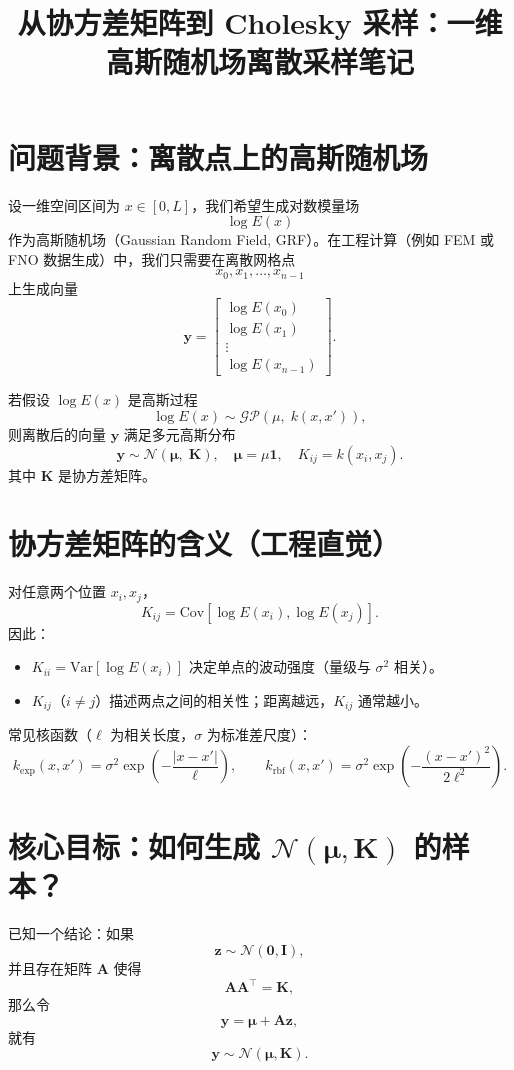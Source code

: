 \documentclass[11pt,a4paper]{article}
\title{从协方差矩阵到 Cholesky 采样：一维高斯随机场离散采样笔记}
\author{}
\date{}
\begin{document}
\maketitle

\section{问题背景：离散点上的高斯随机场}

设一维空间区间为 $x\in[0,L]$，我们希望生成对数模量场
\[
\log E(x)
\]
作为高斯随机场（Gaussian Random Field, GRF）。在工程计算（例如 FEM 或 FNO 数据生成）中，我们只需要在离散网格点
\[
x_0,x_1,\dots,x_{n-1}
\]
上生成向量
\[
\bm{y}=
\begin{bmatrix}
\log E(x_0)\\
\log E(x_1)\\
\vdots\\
\log E(x_{n-1})
\end{bmatrix}.
\]

若假设 $\log E(x)$ 是高斯过程
\[
\log E(x)\sim \mathcal{GP}\!\left(\mu,\;k(x,x')\right),
\]
则离散后的向量 $\bm{y}$ 满足多元高斯分布
\[
\bm{y}\sim \mathcal{N}\!\left(\bm{\mu},\;\bm{K}\right),
\quad
\bm{\mu}=\mu\bm{1},
\quad
K_{ij}=k(x_i,x_j).
\]
其中 $\bm{K}$ 是协方差矩阵。

\section{协方差矩阵的含义（工程直觉）}

对任意两个位置 $x_i,x_j$，
\[
K_{ij}=\mathrm{Cov}\!\left[\log E(x_i),\log E(x_j)\right].
\]
因此：
\begin{itemize}
\item $K_{ii}=\mathrm{Var}[\log E(x_i)]$ 决定单点的波动强度（量级与 $\sigma^2$ 相关）。
\item $K_{ij}$（$i\neq j$）描述两点之间的相关性；距离越远，$K_{ij}$ 通常越小。
\end{itemize}

常见核函数（$\ell$ 为相关长度，$\sigma$ 为标准差尺度）：
\[
k_{\mathrm{exp}}(x,x')=\sigma^2\exp\!\left(-\frac{|x-x'|}{\ell}\right),
\qquad
k_{\mathrm{rbf}}(x,x')=\sigma^2\exp\!\left(-\frac{(x-x')^2}{2\ell^2}\right).
\]

\section{核心目标：如何生成 $\mathcal{N}(\bm{\mu},\bm{K})$ 的样本？}

已知一个结论：如果
\[
\bm{z}\sim \mathcal{N}(\bm{0},\bm{I}),
\]
并且存在矩阵 $\bm{A}$ 使得
\[
\bm{A}\bm{A}^\top=\bm{K},
\]
那么令
\[
\bm{y}=\bm{\mu}+\bm{A}\bm{z},
\]
就有
\[
\bm{y}\sim \mathcal{N}(\bm{\mu},\bm{K}).
\]
\end{document}
